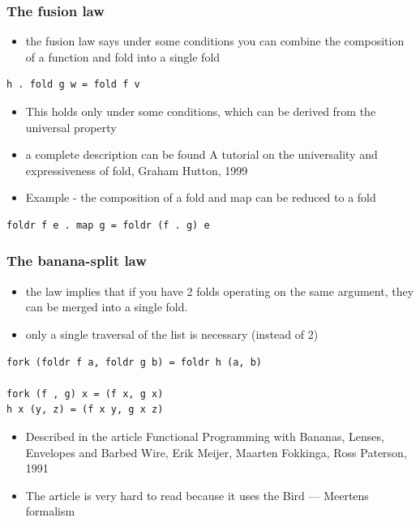 \documentclass[10pt]{beamer}
\begin{document}
\begin{frame}[fragile]
\frametitle{The fusion law}
\begin{itemize}
\item the fusion law says under some conditions you can combine the composition of a function and fold into a single fold 
\end{itemize}

\begin{lstlisting}
h . fold g w = fold f v
\end{lstlisting}

\begin{itemize}
\item This holds only under some conditions, which can be derived from the universal property 
\item a complete description can be found A tutorial on the universality and expressiveness of fold, Graham Hutton, 1999 
\item Example - the composition of a fold and map can be reduced to a fold
\end{itemize}
\begin{lstlisting}
foldr f e . map g = foldr (f . g) e
\end{lstlisting}
\end{frame}




\begin{frame}[fragile]
\frametitle{The banana-split law}
\begin{itemize}
\item the law implies that if you have 2 folds operating on the same argument, they can be merged into a single fold. 
\item only a single traversal of the list is necessary (instead of 2) 
\end{itemize}

\begin{lstlisting}
fork (foldr f a, foldr g b) = foldr h (a, b)

fork (f , g) x = (f x, g x)
h x (y, z) = (f x y, g x z)
\end{lstlisting}

\begin{itemize}
\item Described in the article Functional Programming with Bananas, Lenses, Envelopes and Barbed Wire, Erik Meijer, Maarten Fokkinga, Ross Paterson, 1991
\item The article is very hard to read because it uses the Bird --- Meertens formalism
\end{itemize}
\end{frame}
\end{document}
